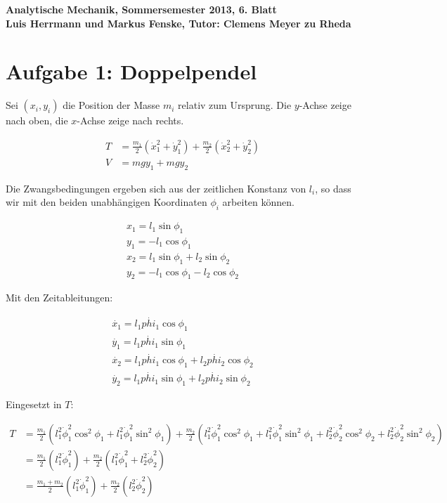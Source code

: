\documentclass[a4paper,german,12pt,smallheadings]{scrartcl}
\begin{document}
\begin{center}
\bfseries %
\sffamily %
\vspace{-40pt}
Analytische Mechanik, Sommersemester 2013, 6. Blatt \\
Luis Herrmann und Markus Fenske, Tutor: Clemens Meyer zu Rheda
\vspace{-10pt}
\end{center}
\section*{Aufgabe 1: Doppelpendel}

Sei $(x_i, y_i)$ die Position der Masse $m_i$ relativ zum Ursprung. Die
$y$-Achse zeige nach oben, die $x$-Achse zeige nach rechts.

\begin{align*}
  T &= \frac{m_1}{2} (\dot{x}_1^2 + \dot{y}_1^2) + \frac{m_2}{2} (\dot{x}_2^2 + \dot{y}_2^2) \\
  V &= mgy_1 + mgy_2
\end{align*}

Die Zwangsbedingungen ergeben sich aus der zeitlichen Konstanz von $l_i$, so
dass wir mit den beiden unabhängigen Koordinaten $\phi_i$ arbeiten können.

\begin{align*}
  x_1 =  l_1 \sin \phi_1 \\
  y_1 = -l_1 \cos \phi_1 \\
  x_2 =  l_1 \sin \phi_1 + l_2 \sin \phi_2 \\
  y_2 = -l_1 \cos \phi_1 - l_2 \cos \phi_2
\end{align*}

Mit den Zeitableitungen:

\begin{align*}
  \dot{x_1} = l_1 \dot{phi_1} \cos \phi_1 \\
  \dot{y_1} = l_1 \dot{phi_1} \sin \phi_1 \\
  \dot{x_2} = l_1 \dot{phi_1} \cos \phi_1 + l_2 \dot{phi_2} \cos \phi_2\\
  \dot{y_2} = l_1 \dot{phi_1} \sin \phi_1 + l_2 \dot{phi_2} \sin \phi_2
\end{align*}

Eingesetzt in $T$:

\begin{align*}
  T &= \frac{m_1}{2} (l_1^2 \dot{\phi}_1^2 \cos^2 \phi_1 + l_1^2 \dot{\phi}_1^2 \sin^2 \phi_1) +
       \frac{m_2}{2} (l_1^2 \dot{\phi}_1^2 \cos^2 \phi_1 + l_1^2 \dot{\phi}_1^2 \sin^2 \phi_1 +
                      l_2^2 \dot{\phi}_2^2 \cos^2 \phi_2 + l_2^2 \dot{\phi}_2^2 \sin^2 \phi_2) \\
    &= \frac{m_1}{2} (l_1^2 \dot{\phi}_1^2) + \frac{m_2}{2} (l_1^2 \dot{\phi}_1^2 + l_2^2 \dot{\phi}_2^2) \\
    &= \frac{m_1 + m_2}{2} (l_1^2 \dot{\phi}_1^2) + \frac{m_2}{2} (l_2^2 \dot{\phi}_2^2) \\
\end{align*}
\end{document}
